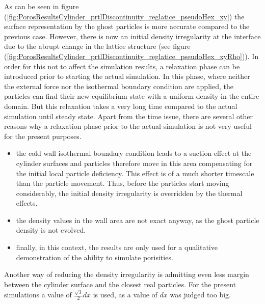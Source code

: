 \documentclass{report}
\begin{document}
As can be seen in figure (\ref{fig:PorosResultsCylinder_prtlDiscontinuity_reglatice_pseudoHex_xy}) the surface representation by the ghost particles is more accurate compared to the previous case. However, there is now an initial density irregularity at the interface due to the abrupt change in the lattice structure (see figure (\ref{fig:PorosResultsCylinder_prtlDiscontinuity_reglatice_pseudoHex_xyRho})). 
In order for this not to affect the simulation results, a relaxation phase can be introduced prior to starting the actual simulation. In this phase, where neither the external force nor the isothermal boundary condition are applied, the particles can find their new equilibrium state with a uniform density in the entire domain. But this relaxation takes a very long time compared to the actual simulation until steady state.
Apart from the time issue, there are several other reasons why a relaxation phase prior to the actual simulation is not very useful for the present purposes. 
\begin{itemize}
 \item 	the cold wall isothermal boundary condition leads to a suction effect at the cylinder surfaces and particles therefore move in this area compensating for the initial local particle deficiency. This effect is of a much shorter timescale than the particle movement. Thus, before the particles start moving considerably, the initial density irregularity is overridden by the thermal effects.
\item the density values in the wall area are not exact anyway, as the ghost particle density is not evolved.
\item finally, in this context, the results are only used for a qualitative demonstration of the ability to simulate porisities.
\end{itemize}



Another way of reducing the density irregularity is admitting even less margin between the cylinder surface and the closest real particles. For the present simulations a value of $\frac{\sqrt{3}}{2}dx$ is used, as a value of $dx$ was judged too big.
\end{document}
